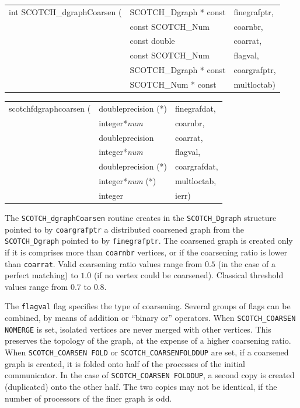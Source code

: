 \begin{itemize}
\progsyn

{\tt\begin{tabular}{l@{}ll}
int SCOTCH\_dgraphCoarsen ( & SCOTCH\_Dgraph * const & finegrafptr, \\
                            & const SCOTCH\_Num      & coarnbr,     \\
                            & const double           & coarrat,     \\
                            & const SCOTCH\_Num      & flagval,     \\
                            & SCOTCH\_Dgraph * const & coargrafptr, \\
                            & SCOTCH\_Num * const    & multloctab)  \\
\end{tabular}}

{\tt\begin{tabular}{l@{}ll}
scotchfdgraphcoarsen ( & doubleprecision (*)   & finegrafdat, \\
                       & integer*{\it num}     & coarnbr,     \\
                       & doubleprecision       & coarrat,     \\
                       & integer*{\it num}     & flagval,     \\
                       & doubleprecision (*)   & coargrafdat, \\
                       & integer*{\it num} (*) & multloctab,  \\
                       & integer               & ierr)
\end{tabular}}

\progdes

The {\tt SCOTCH\_dgraphCoarsen} routine creates in the
{\tt SCOTCH\_\lbt Dgraph} structure pointed to by {\tt coargrafptr}
a distributed coarsened graph from the {\tt SCOTCH\_\lbt Dgraph}
pointed to by {\tt finegrafptr}. The coarsened graph is created only
if it is comprises more than {\tt coarnbr} vertices, or if the
coarsening ratio is lower than {\tt coarrat}. Valid coarsening ratio
values range from $0.5$ (in the case of a perfect matching) to $1.0$
(if no vertex could be coarsened). Classical threshold values range
from $0.7$ to $0.8$.

The {\tt flagval} flag specifies the type of coarsening. Several
groups of flags can be combined, by means of addition or
``binary or'' operators. When {\tt SCOTCH\_\lbt COARSEN\lbt
NO\lbt MERGE} is set, isolated vertices are never merged with other
vertices. This preserves the topology of the graph, at the expense of
a higher coarsening ratio. When {\tt SCOTCH\_\lbt COARSEN\lbt
FOLD} or {\tt SCOTCH\_\lbt COARSEN\lbt FOLD\lbt DUP} are set, if a
coarsened graph is created, it is folded onto half of the processes of
the initial communicator. In the case of {\tt SCOTCH\_\lbt COARSEN\lbt
FOLD\lbt DUP}, a second copy is created (duplicated) onto the other
half. The two copies may not be identical, if the number of processors
of the finer graph is odd.


\end{itemize}
